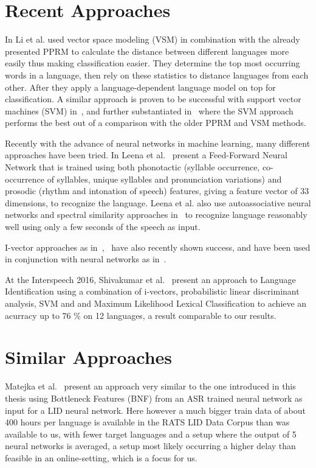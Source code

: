 \section{Recent Approaches}
In \cite{4032773} Li et al. used vector space modeling (VSM) in combination with the already presented PPRM to calculate the distance between different languages more easily thus making classification easier. They determine the top most occurring words in a language, then rely on these statistics to distance languages from each other. After they apply a language-dependent language model on top for classification. A similar approach is proven to be successful with support vector machines (SVM) in~\cite{4590023}, and further substantiated in~\cite{ma2006comparative} where the SVM approach performs the best out of a comparison with the older PPRM and VSM methods.
\par
Recently with the advance of neural networks in machine learning, many different approaches have been tried. In Leena et al.~\cite{1529486} present a Feed-Forward Neural Network that is trained using both phonotactic (syllable occurrence, co-occurrence of syllables, unique syllables and pronunciation variations) and prosodic (rhythm and intonation of speech) features, giving a feature vector of 33 dimensions, to recognize the language. Leena et al. also use autoassociative neural networks and spectral similarity approaches in~\cite{1287674} to recognize language reasonably well using only a few seconds of the speech as input.

\par

I-vector approaches as in~\cite{6680440},~\cite{d2012phonotactic} have also recently shown success, and have been used in conjunction with neural networks as in~\cite{song2015deep}.

At the Interspeech 2016, Shivakumar et al.~\cite{Shivakumar+2016} present an approach to Language Identification using a combination of i-vectors, probabilistic linear discriminant analysis, SVM and  and Maximum Likelihood Lexical Classification to achieve an acurracy up to 76 \% on 12 languages, a result comparable to our results.

\section{Similar Approaches}
Matejka et al.~\cite{matejka2014neural} present an approach very similar to the one introduced in this thesis using Bottleneck Features (BNF) from an ASR trained neural network as input for a LID neural network. Here however a much bigger train data of about 400 hours per language is available in the RATS LID Data Corpus than was available to us, with fewer target languages and a setup where the output of 5 neural networks is averaged, a setup most likely occurring a higher delay than feasible in an online-setting, which is a focus for us.

